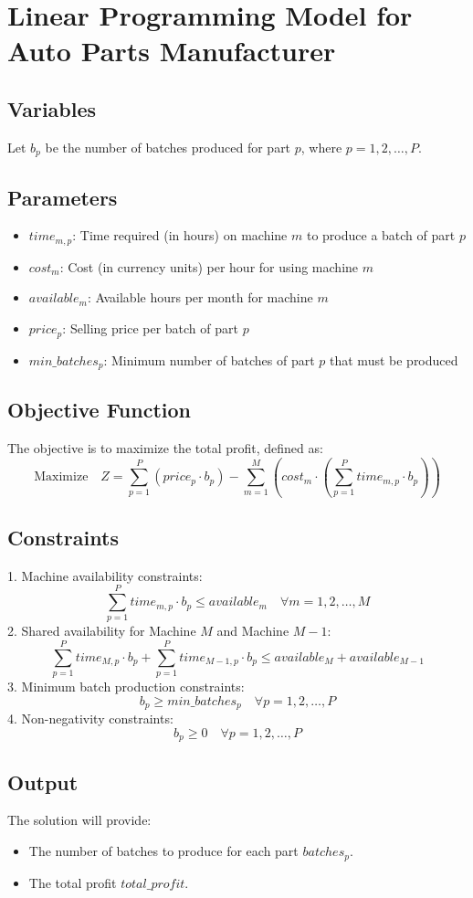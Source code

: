 \documentclass{article}
\begin{document}
\section*{Linear Programming Model for Auto Parts Manufacturer}

\subsection*{Variables}
Let \( b_p \) be the number of batches produced for part \( p \), where \( p = 1, 2, \ldots, P \).

\subsection*{Parameters}
\begin{itemize}
    \item \( time_{m,p} \): Time required (in hours) on machine \( m \) to produce a batch of part \( p \) 
    \item \( cost_m \): Cost (in currency units) per hour for using machine \( m \) 
    \item \( available_m \): Available hours per month for machine \( m \) 
    \item \( price_p \): Selling price per batch of part \( p \) 
    \item \( min\_batches_p \): Minimum number of batches of part \( p \) that must be produced 
\end{itemize}

\subsection*{Objective Function}
The objective is to maximize the total profit, defined as:
\[
\text{Maximize} \quad Z = \sum_{p=1}^{P} \left( price_p \cdot b_p \right) - \sum_{m=1}^{M} \left( cost_m \cdot \left( \sum_{p=1}^{P} time_{m,p} \cdot b_p \right) \right)
\]

\subsection*{Constraints}
1. Machine availability constraints:
\[
\sum_{p=1}^{P} time_{m,p} \cdot b_p \leq available_m \quad \forall m = 1, 2, \ldots, M
\]
2. Shared availability for Machine \( M \) and Machine \( M-1 \):
\[
\sum_{p=1}^{P} time_{M,p} \cdot b_p + \sum_{p=1}^{P} time_{M-1,p} \cdot b_p \leq available_M + available_{M-1}
\]
3. Minimum batch production constraints:
\[
b_p \geq min\_batches_p \quad \forall p = 1, 2, \ldots, P
\]
4. Non-negativity constraints:
\[
b_p \geq 0 \quad \forall p = 1, 2, \ldots, P
\]

\subsection*{Output}
The solution will provide:
\begin{itemize}
    \item The number of batches to produce for each part \( batches_p \).
    \item The total profit \( total\_profit \).
\end{itemize}
\end{document}
